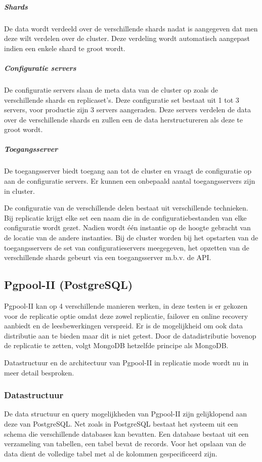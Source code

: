 \subparagraph{Shards} De data wordt verdeeld over de verschillende shards nadat is aangegeven dat men deze wilt verdelen over de cluster. Deze verdeling wordt automatisch aangepast indien een enkele shard te groot wordt. 
\subparagraph{Configuratie servers} De configuratie servers slaan de meta data van de cluster op zoals de verschillende shards en replicaset's. Deze configuratie set bestaat uit 1 tot 3 servers, voor productie zijn 3 servers aangeraden. Deze servers verdelen de data over de verschillende shards en zullen een de data herstructureren als deze te groot wordt. 
\subparagraph{Toegangsserver} De toegangsserver biedt toegang aan tot de cluster en vraagt de configuratie op aan de configuratie servers. Er kunnen een onbepaald aantal toegangsservers zijn in cluster. 

De configuratie van de verschillende delen bestaat uit verschillende technieken. Bij replicatie krijgt elke set een naam die in de configuratiebestanden van elke configuratie wordt gezet. Nadien wordt één instantie op de hoogte gebracht van de locatie van de andere instanties. Bij de cluster worden bij het opstarten van de toegangsservers de set van configuratieservers meegegeven, het opzetten van de verschillende shards gebeurt via een toegangsserver m.b.v. de API. 

\subsection{Pgpool-II (PostgreSQL)\cite{pgpool-doc}}
Pgpool-II kan op 4 verschillende manieren werken, in deze testen is er gekozen voor de replicatie optie omdat deze zowel replicatie, failover en online recovery aanbiedt en de leesbewerkingen verspreid. Er is de mogelijkheid om ook data distributie aan te bieden maar dit is niet getest. Door de datadistributie bovenop de replicatie te zetten, volgt MongoDB hetzelfde principe als MongoDB. 

Datastructuur en de architectuur van Pgpool-II in replicatie mode wordt nu in meer detail besproken. 

\subsubsection{Datastructuur}
De data structuur en query mogelijkheden van Pgpool-II zijn gelijklopend aan deze van PostgreSQL. Net zoals in PostgreSQL bestaat het systeem uit een schema die verschillende databases kan bevatten. Een database bestaat uit een verzameling van tabellen, een tabel bevat de records. Voor het opslaan van de data dient de volledige tabel met al de kolommen gespecificeerd zijn. 

